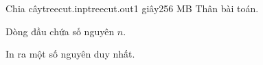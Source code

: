 \begin{problem}{Chia cây}{treecut.inp}{treecut.out}{1 giây}{256 MB}
Thân bài toán.

\InputFile
Dòng đầu chứa số nguyên $n$.

\OutputFile
In ra một số nguyên duy nhất.
\end{problem}
